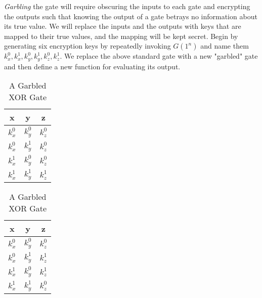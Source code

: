 \documentclass{article}
\begin{document}
\textit{Garbling} the gate will require obscuring the inputs to each gate and encrypting the outputs such that knowing the output of a gate betrays no information about its true value. We will replace the inputs and the outputs with keys that are mapped to their true values, and the mapping will be kept secret. Begin by generating six encryption keys by repeatedly invoking $G(1^n)$ and name them $k_x^0, k_x^1, k_y^0, k_y^1, k_z^0, k_z^1$. We replace the above standard gate with a new "garbled" gate and then define a new function for evaluating its output.

\begin{table}[h]
\begin{minipage}{.5\linewidth}
\centering
\begin{tabular}{c c | c}
	x & y & z \\ \hline
	$k_x^0$ & $k_y^0$ & $k_z^0$ \\
	$k_x^0$ & $k_y^1$ & $k_z^0$ \\
	$k_x^1$ & $k_y^0$ & $k_z^0$ \\
	$k_x^1$ & $k_y^1$ & $k_z^1$ \\
\end{tabular}
\caption{A Garbled AND Gate}
\label{garbled-and-gate}
\end{minipage}
\begin{minipage}{.5\linewidth}
\centering
\begin{tabular}{c c | c}
	x & y & z \\ \hline
	$k_x^0$ & $k_y^0$ & $k_z^0$ \\
	$k_x^0$ & $k_y^1$ & $k_z^1$ \\
	$k_x^1$ & $k_y^0$ & $k_z^1$ \\
	$k_x^1$ & $k_y^1$ & $k_z^0$ \\
\end{tabular}
\caption{A Garbled XOR Gate}
\label{garbled-xor-gate}
\end{minipage}
\end{table}
\end{document}
